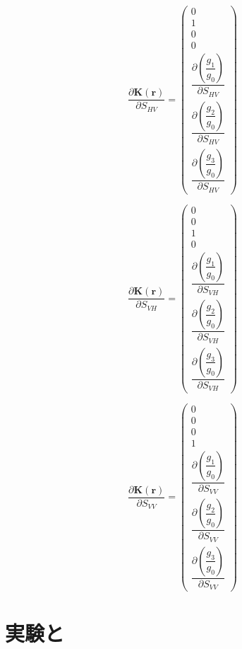 \documentclass[12pt,a4paper]{jsreport}
\begin{document}
  \begin{equation}
    \frac{\partial \bm{K({\bm{r}})}}{\partial S_{HV}} 
    = \begin{pmatrix} 0 \\ 1 \\ 0 \\ 0 \\  \dfrac{\partial (\dfrac{g_{1}}{g_{0}})}{\partial S_{HV}}  \\  \dfrac{\partial (\dfrac{g_{2}}{g_{0}})}{\partial S_{HV}} \\  \dfrac{\partial (\dfrac{g_{3}}{g_{0}})}{\partial S_{HV}} \end{pmatrix}
    \label{polarimetricdiffSHV}
    \end{equation}
  
  
    \begin{equation}
      \frac{\partial \bm{K({\bm{r}})}}{\partial S_{VH}} 
      = \begin{pmatrix} 0 \\ 0 \\ 1 \\ 0 \\  \dfrac{\partial (\dfrac{g_{1}}{g_{0}})}{\partial S_{VH}}  \\  \dfrac{\partial (\dfrac{g_{2}}{g_{0}})}{\partial S_{VH}} \\  \dfrac{\partial (\dfrac{g_{3}}{g_{0}})}{\partial S_{VH}} \end{pmatrix}
      \label{polarimetricdiffSVH}
      \end{equation}
  
    \begin{equation}
      \frac{\partial \bm{K({\bm{r}})}}{\partial S_{VV}} 
      = \begin{pmatrix} 0 \\ 0 \\ 0 \\ 1 \\  \dfrac{\partial (\dfrac{g_{1}}{g_{0}})}{\partial S_{VV}}  \\  \dfrac{\partial (\dfrac{g_{2}}{g_{0}})}{\partial S_{VV}} \\  \dfrac{\partial (\dfrac{g_{3}}{g_{0}})}{\partial S_{VV}} \end{pmatrix}
      \label{polarimetricdiffSVV}
      \end{equation}


\chapter{実験と}
\end{document}
